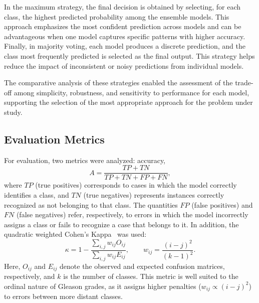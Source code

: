 In the maximum strategy, the final decision is obtained by selecting, for each class, the highest predicted probability among the ensemble models. This approach emphasizes the most confident prediction across models and can be advantageous when one model captures specific patterns with higher accuracy. Finally, in majority voting, each model produces a discrete prediction, and the class most frequently predicted is selected as the final output. This strategy helps reduce the impact of inconsistent or noisy predictions from individual models.

The comparative analysis of these strategies enabled the assessment of the trade-off among simplicity, robustness, and sensitivity to performance for each model, supporting the selection of the most appropriate approach for the problem under study.


\subsection{Evaluation Metrics}

For evaluation, two metrics were analyzed: accuracy,
\[
A = \frac{TP + TN}{TP + TN + FP + FN},
\]
where $TP$ (true positives) corresponds to cases in which the model correctly identifies a class, and $TN$ (true negatives) represents instances correctly recognized as not belonging to that class. The quantities $FP$ (false positives) and $FN$ (false negatives) refer, respectively, to errors in which the model incorrectly assigns a class or fails to recognize a case that belongs to it. In addition, the quadratic weighted Cohen’s Kappa~\cite{ref-cohen1968} was used:
\[
\kappa = 1 - \frac{\sum_{i,j} w_{ij} O_{ij}}{\sum_{i,j} w_{ij} E_{ij}},
\qquad
w_{ij} = \frac{(i-j)^2}{(k-1)^2}.
\]
Here, $O_{ij}$ and $E_{ij}$ denote the observed and expected confusion matrices, respectively, and $k$ is the number of classes. This metric is well suited to the ordinal nature of Gleason grades, as it assigns higher penalties ($w_{ij} \propto (i-j)^2$) to errors between more distant classes.

